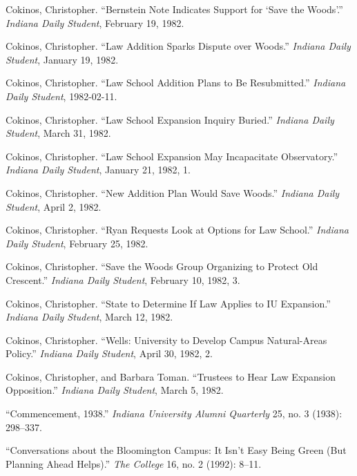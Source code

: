 \documentclass[
  american,
  letterpaper,
]{scrreprt}
\newlength{\cslhangindent}
\newenvironment{CSLReferences}[2] %
 {\begin{list}{}{%
  \setlength{\itemindent}{0pt}
  \setlength{\leftmargin}{0pt}
  \setlength{\parsep}{0pt}
  \ifodd #1
   \setlength{\leftmargin}{\cslhangindent}
   \setlength{\itemindent}{-1\cslhangindent}
  \fi
  \setlength{\itemsep}{#2\baselineskip}}}
 {\end{list}}
\begin{document}
\begin{CSLReferences}{1}{0}
Cokinos, Christopher. {``{Bernstein Note Indicates Support for {`Save
the Woods'}}.''} \emph{Indiana Daily Student}, February 19, 1982.

Cokinos, Christopher. {``Law Addition Sparks Dispute over Woods.''}
\emph{Indiana Daily Student}, January 19, 1982.

Cokinos, Christopher. {``Law School Addition Plans to Be Resubmitted.''}
\emph{Indiana Daily Student}, 1982-02-11.

Cokinos, Christopher. {``Law School Expansion Inquiry Buried.''}
\emph{Indiana Daily Student}, March 31, 1982.

Cokinos, Christopher. {``Law School Expansion May Incapacitate
Observatory.''} \emph{Indiana Daily Student}, January 21, 1982, 1.

Cokinos, Christopher. {``New Addition Plan Would Save Woods.''}
\emph{Indiana Daily Student}, April 2, 1982.

Cokinos, Christopher. {``Ryan Requests Look at Options for Law
School.''} \emph{Indiana Daily Student}, February 25, 1982.

Cokinos, Christopher. {``Save the Woods Group Organizing to Protect Old
Crescent.''} \emph{Indiana Daily Student}, February 10, 1982, 3.

Cokinos, Christopher. {``State to Determine If Law Applies to IU
Expansion.''} \emph{Indiana Daily Student}, March 12, 1982.

Cokinos, Christopher. {``Wells: University to Develop Campus
Natural-Areas Policy.''} \emph{Indiana Daily Student}, April 30, 1982,
2.

Cokinos, Christopher, and Barbara Toman. {``Trustees to Hear Law
Expansion Opposition.''} \emph{Indiana Daily Student}, March 5, 1982.

{``Commencement, 1938.''} \emph{Indiana University Alumni Quarterly} 25,
no. 3 (1938): 298--337.

{``Conversations about the Bloomington Campus: It Isn't Easy Being Green
{(But Planning Ahead Helps)}.''} \emph{The College} 16, no. 2 (1992):
8--11.


\end{CSLReferences}
\end{document}
